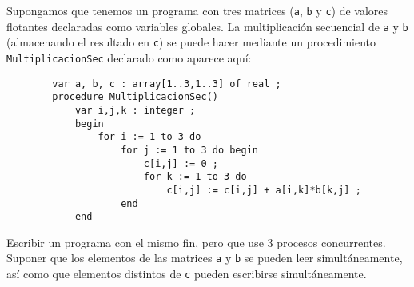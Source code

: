 \begin{ejercicio} \label{ej:7}
    Supongamos que tenemos un programa con tres matrices (\verb|a|, \verb|b| y \verb|c|) de valores flotantes declaradas
    como variables globales. La multiplicación secuencial de \verb|a| y \verb|b| (almacenando el resultado en \verb|c|)
    se puede hacer mediante un procedimiento \verb|MultiplicacionSec| declarado como aparece aquí:
    \begin{verbatim}
        var a, b, c : array[1..3,1..3] of real ;
        procedure MultiplicacionSec()
            var i,j,k : integer ;
            begin
                for i := 1 to 3 do
                    for j := 1 to 3 do begin
                        c[i,j] := 0 ;
                        for k := 1 to 3 do
                            c[i,j] := c[i,j] + a[i,k]*b[k,j] ;
                    end
            end
    \end{verbatim}
    Escribir un programa con el mismo fin, pero que use 3 procesos concurrentes. Suponer que
    los elementos de las matrices \verb|a| y \verb|b| se pueden leer simultáneamente, así como que elementos distintos de \verb|c| pueden escribirse simultáneamente.\\


\end{ejercicio}
